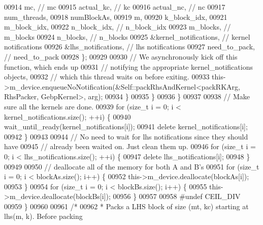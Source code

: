 \begin{DoxyCode}
{00914             mc,           \textcolor{comment}{// mc}
00915             actual\_kc,    \textcolor{comment}{// kc}
00916             actual\_nc,    \textcolor{comment}{// nc}
00917             num\_threads,
00918             numBlockAs,
00919             m,
00920             k\_block\_idx,
00921             m\_block\_idx,
00922             n\_block\_idx, \textcolor{comment}{// n\_block\_idx}
00923             m\_blocks, \textcolor{comment}{// m\_blocks}
00924             n\_blocks, \textcolor{comment}{// n\_blocks}
00925             &kernel\_notifications, \textcolor{comment}{// kernel notifications}
00926             &lhs\_notifications,    \textcolor{comment}{// lhs notifications}
00927             need\_to\_pack, \textcolor{comment}{// need\_to\_pack}
00928           \};
00929 
00930           \textcolor{comment}{// We asynchronously kick off this function, which ends up}
00931           \textcolor{comment}{// notifying the appropriate kernel\_notifications objects,}
00932           \textcolor{comment}{// which this thread waits on before exiting.}
00933           this->m\_device.enqueueNoNotification(&Self::packRhsAndKernel<packRKArg, RhsPacker, GebpKernel>, 
      arg);
00934         \}
00935       \}
00936     \}
00937 
00938     \textcolor{comment}{// Make sure all the kernels are done.}
00939     \textcolor{keywordflow}{for} (\textcolor{keywordtype}{size\_t} i = 0; i < kernel\_notifications.size(); ++i) \{
00940       wait\_until\_ready(kernel\_notifications[i]);
00941       \textcolor{keyword}{delete} kernel\_notifications[i];
00942     \}
00943 
00944     \textcolor{comment}{// No need to wait for lhs notifications since they should have}
00945     \textcolor{comment}{// already been waited on.  Just clean them up.}
00946     \textcolor{keywordflow}{for} (\textcolor{keywordtype}{size\_t} i = 0; i < lhs\_notifications.size(); ++i) \{
00947       \textcolor{keyword}{delete} lhs\_notifications[i];
00948     \}
00949 
00950     \textcolor{comment}{// deallocate all of the memory for both A and B's}
00951     \textcolor{keywordflow}{for} (\textcolor{keywordtype}{size\_t} i = 0; i < blockAs.size(); i++) \{
00952       this->m\_device.deallocate(blockAs[i]);
00953     \}
00954     \textcolor{keywordflow}{for} (\textcolor{keywordtype}{size\_t} i = 0; i < blockBs.size(); i++) \{
00955       this->m\_device.deallocate(blockBs[i]);
00956     \}
00957 
00958 \textcolor{preprocessor}{#undef CEIL\_DIV}
00959   \}
00960 
00961   \textcolor{comment}{/*}
00962 \textcolor{comment}{   * Packs a LHS block of size (mt, kc) starting at lhs(m, k). Before packing}
}
\end{DoxyCode}
